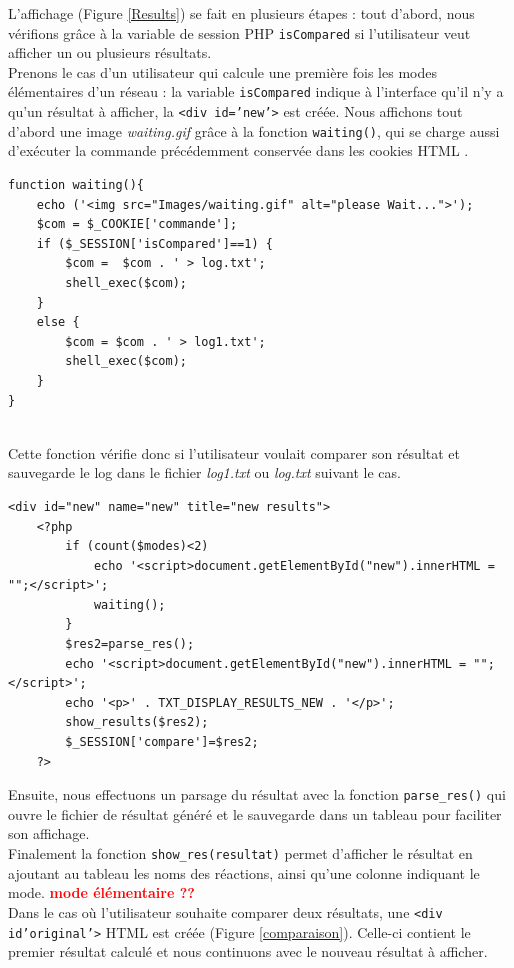 L'affichage (Figure \ref{Results}) se fait en plusieurs étapes : tout d'abord, nous vérifions grâce à la variable de session PHP \texttt{isCompared} si l'utilisateur veut afficher un ou plusieurs résultats.\\

Prenons le cas d'un utilisateur qui calcule une première fois les modes élémentaires d'un réseau : la variable \texttt{isCompared} indique à l'interface qu'il n'y a qu'un résultat à afficher, la \texttt{<div id='new'>} est créée. Nous affichons tout d'abord une image \emph{waiting.gif} grâce à la fonction \texttt{waiting()}, qui se charge aussi d'exécuter la commande précédemment conservée dans les cookies HTML .\\

\begin{DDbox}{\linewidth}
\begin{lstlisting}
function waiting(){
	echo ('<img src="Images/waiting.gif" alt="please Wait...">');
	$com = $_COOKIE['commande'];
	if ($_SESSION['isCompared']==1) {
		$com =  $com . ' > log.txt';
		shell_exec($com);
	}
	else {
		$com = $com . ' > log1.txt';
		shell_exec($com);
	}
}
\end{lstlisting}
\end{DDbox}\\

Cette fonction vérifie donc si l'utilisateur voulait comparer son résultat et sauvegarde le log dans le fichier \emph{log1.txt} ou \emph{log.txt} suivant le cas.\\

\begin{DDbox}{\linewidth}
\begin{lstlisting}
<div id="new" name="new" title="new results">
	<?php
		if (count($modes)<2)
			echo '<script>document.getElementById("new").innerHTML = "";</script>';
			waiting();
		}
		$res2=parse_res();
		echo '<script>document.getElementById("new").innerHTML = "";</script>';
		echo '<p>' . TXT_DISPLAY_RESULTS_NEW . '</p>';
		show_results($res2);
		$_SESSION['compare']=$res2;
	?>		
\end{lstlisting}
\end{DDbox}

Ensuite, nous effectuons un parsage du résultat avec la fonction \texttt{parse\_res()} qui ouvre le fichier de résultat généré et le sauvegarde dans un tableau pour faciliter son affichage. \\
Finalement la fonction \texttt{show\_res(resultat)} permet d'afficher le résultat en ajoutant au tableau les noms des réactions, ainsi qu'une colonne indiquant le mode. \textbf{\textcolor{red}{mode élémentaire ??}} \\
Dans le cas où l'utilisateur souhaite comparer deux résultats, une \texttt{<div id'original'>} HTML est créée (Figure \ref{comparaison}). Celle-ci contient le premier résultat calculé et nous continuons avec le nouveau résultat à afficher.\\

